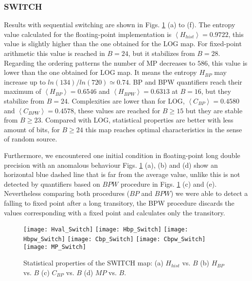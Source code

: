 \subsubsection{SWITCH} \label{sssec:switch}

Results with sequential switching are shown in Figs. \ref{fig:SWITCH_QuantiB} (a) to (f).
The entropy value calculated for the floating-point implementation is $\left\langle H_{hist}\right\rangle =0.9722$, this value is slightly higher than the one obtained for the LOG map. 
For fixed-point arithmetic this value is reached in $B=24$, but it stabilizes from $B=28$.
Regarding the ordering patterns the number of MP decreases to $586$, this value is lower than the one obtained for LOG map.
It means the entropy $H_{BP}$ may increase up to $ln(134)/ln(720)\simeq 0.74$.
BP and BPW quantifiers reach their maximum of $\left\langle H_{BP}\right\rangle =0.6546$ and $\left\langle H_{BPW}\right\rangle =0.6313$ at $B=16$, but they stabilize from $B=24$.
Complexities are lower than for LOG, $\left\langle C_{BP}\right\rangle =0.4580$ and $\left\langle C_{BPW}\right\rangle =0.4578$, these values are reached for $B \geq 15$ but they are stable from $B \geq 23$.
Compared with LOG, statistical properties are better with less amount of bits, for $B \geq 24$ this map reaches optimal characteristics in the sense of random source.

Furthermore, we encountered one initial condition in floating-point long double precision with an anomalous behaviour
Figs. \ref{fig:SWITCH_QuantiB} (a), (b) and (d) show an horizontal blue dashed line that is far from the average value, unlike this is not detected by quantifiers based on $BPW$ procedure in Figs. \ref{fig:SWITCH_QuantiB} (c) and (e).
Nevertheless comparing both procedures ($BP$ and $BPW$) we were able to detect a falling to fixed point after a long transitory, the BPW procedure discards the values corresponding with a fixed point and calculates only the transitory.

\begin{figure}
	\texttt{[image: Hval\_Switch]}
	\texttt{[image: Hbp\_Switch]}
	\texttt{[image: Hbpw\_Switch]}
	\texttt{[image: Cbp\_Switch]}
	\texttt{[image: Cbpw\_Switch]}
	\texttt{[image: MP\_Switch]}
	\caption{Statistical properties of the SWITCH map: (a) $H_{hist}$ vs. $B$ (b) $H_{BP}$ vs. $B$ (c) $C_{BP}$ vs. $B$ (d) $MP$ vs. $B$.}
	\label{fig:SWITCH_QuantiB}
\end{figure}

